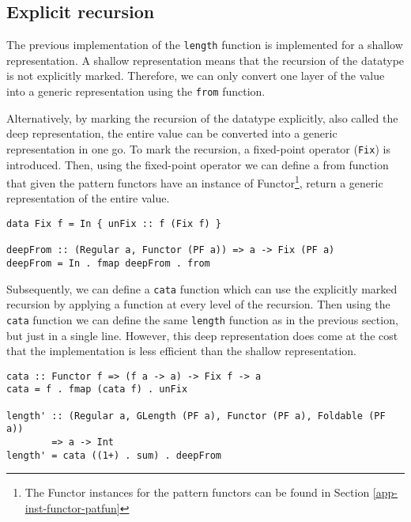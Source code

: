 \subsection{Explicit recursion}


The previous implementation of the \texttt{length} function is implemented for a shallow representation. A shallow representation means that the recursion of the datatype is not explicitly marked. Therefore, we can only convert one layer of the value into a generic representation using the \texttt{from} function. 

Alternatively, by marking the recursion of the datatype explicitly, also called the deep representation, the entire value can be converted into a generic representation in one go. To mark the recursion, a fixed-point operator (\texttt{Fix}) is introduced. Then, using the fixed-point operator we can define a from function that given the pattern functors have an instance of Functor\footnote{The Functor instances for the pattern functors can be found in Section \ref{app-inst-functor-patfun}}, return a generic representation of the entire value.

\begin{verbatim}
data Fix f = In { unFix :: f (Fix f) }

deepFrom :: (Regular a, Functor (PF a)) => a -> Fix (PF a)
deepFrom = In . fmap deepFrom . from
\end{verbatim}

Subsequently, we can define a \texttt{cata} function which can use the explicitly marked recursion by applying a function at every level of the recursion. Then using the \texttt{cata} function we can define the same \texttt{length} function as in the previous section, but just in a single line. However, this deep representation does come at the cost that the implementation is less efficient than the shallow representation. 

\begin{verbatim}
cata :: Functor f => (f a -> a) -> Fix f -> a
cata = f . fmap (cata f) . unFix

length' :: (Regular a, GLength (PF a), Functor (PF a), Foldable (PF a)) 
        => a -> Int
length' = cata ((1+) . sum) . deepFrom
\end{verbatim}